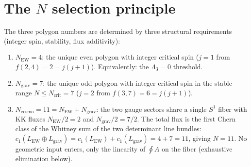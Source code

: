 \section{The $N$ selection principle}
\label{sec:n-selection}

\begin{derivation}
\label{thm:n-selection}
The three polygon numbers are determined by three structural
requirements (integer spin, stability, flux additivity):
\begin{enumerate}
\item[(a)] $N_{\mathrm{EW}} = 4$: the unique even polygon with
  integer critical spin ($j = 1$ from $f(2,4) = 2 = j(j{+}1)$).
  Equivalently: the $\Lambda_3 = 0$ threshold.
\item[(b)] $N_{\mathrm{grav}} = 7$: the unique odd polygon with
  integer critical spin in the stable range $N \le N_{\mathrm{crit}} = 7$
  ($j = 2$ from $f(3,7) = 6 = j(j{+}1)$).
\item[(c)] $N_{\mathrm{cosmo}} = 11 = N_{\mathrm{EW}} + N_{\mathrm{grav}}$:
  the two gauge sectors share a single $S^1$ fiber
  with KK fluxes $N_{\mathrm{EW}}/2 = 2$ and
  $N_{\mathrm{grav}}/2 = 7/2$.
  The total flux is the first Chern class of the
  Whitney sum of the two determinant line bundles:
  $c_1(L_{\mathrm{EW}} \oplus L_{\mathrm{grav}})
  = c_1(L_{\mathrm{EW}}) + c_1(L_{\mathrm{grav}})
  = 4 + 7 = 11$, giving $N = 11$.
  No geometric input enters, only the linearity of
  $\oint A$ on the fiber (exhaustive elimination below).
\end{enumerate}
\end{derivation}

